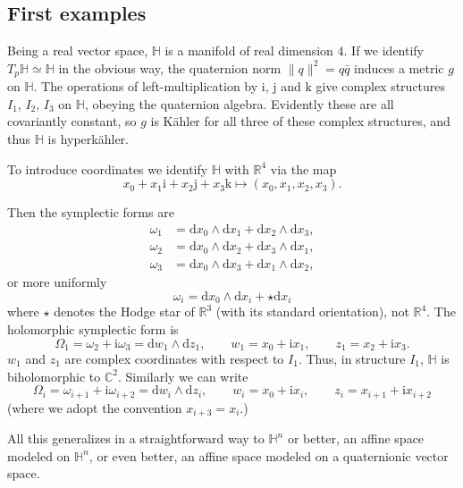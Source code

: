 \documentclass[12pt,letterpaper,reqno]{article}
\numberwithin{equation}{section}
\newcommand{\R}{\ensuremath{\mathbb R}}
\newcommand{\C}{\ensuremath{\mathbb C}}
\newcommand{\bbH}{\ensuremath{\mathbb H}}
\newcommand{\kahler}{K\"ahler\xspace}
\newcommand{\hk}{hyperk\"ahler\xspace}
\newcommand{\I}{{\mathrm i}}
\newcommand{\J}{{\mathrm j}}
\newcommand{\K}{{\mathrm k}}
\newcommand{\de}{\mathrm{d}}
\newcommand{\norm}[1]{\lVert#1\rVert}
\begin{document}
\subsection{First examples}

\begin{example} \label{exa:R4}
Being a real vector space, $\bbH$ is
a manifold of real dimension $4$.
If we identify $T_p \bbH \simeq \bbH$ in the obvious way,
the quaternion norm $\norm{q}^2 = q \bar{q}$
induces a metric $g$ on $\bbH$.
The operations of left-multiplication by $\I$, $\J$ and $\K$
give complex structures $I_1$, $I_2$, $I_3$ on $\bbH$,
obeying the quaternion algebra.
Evidently these are all covariantly constant, so
$g$ is \kahler for all three of these complex
structures, and thus $\bbH$ is \hk.

To introduce coordinates we
identify $\bbH$ with $\R^4$
via the map
\begin{equation}
  x_0 + x_1 \I + x_2 \J + x_3 \K \mapsto (x_0,x_1,x_2,x_3).
\end{equation}

Then the symplectic forms are
\begin{align}
  \omega_1 &= \de x_0 \wedge \de x_1 + \de x_2 \wedge \de x_3, \\
  \omega_2 &= \de x_0 \wedge \de x_2 + \de x_3 \wedge \de x_1, \\
  \omega_3 &= \de x_0 \wedge \de x_3 + \de x_1 \wedge \de x_2,
\end{align}
or more uniformly
\begin{equation} \label{eq:symplectic-forms-R4}
  \omega_i = \de x_0 \wedge \de x_i + \star \de x_i
\end{equation}
where $\star$ denotes the Hodge star of $\R^3$ (with its 
standard orientation), not $\R^4$.
The holomorphic symplectic form is
\begin{equation}
  \Omega_1 = \omega_2 + \I \omega_3 = \de w_1 \wedge \de z_1, \qquad w_1 = x_0 + \I x_1, \qquad z_1 = x_2 + \I x_3.
\end{equation}
$w_1$ and $z_1$ are complex coordinates with respect to $I_1$.
Thus, in structure $I_1$, $\bbH$ is biholomorphic to $\C^2$.
Similarly we can write
\begin{equation} \label{eq:Omega-i-R4}
  \Omega_i = \omega_{i+1} + \I \omega_{i+2} = \de w_i \wedge \de z_i, \qquad w_i = x_0 + \I x_i, \qquad z_i = x_{i+1} + \I x_{i+2}
\end{equation}
(where we adopt the convention $x_{i+3} = x_i$.)

All this generalizes in a straightforward way to $\bbH^n$ 
or better, an affine space modeled on $\bbH^n$, or even 
better, an affine space modeled on a quaternionic vector space.
\end{example}
\end{document}
